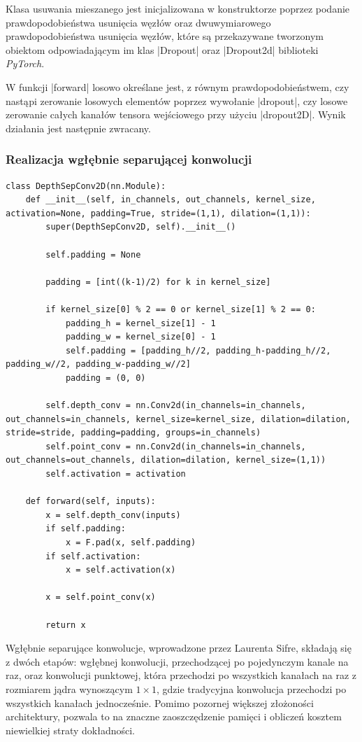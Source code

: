 Klasa usuwania mieszanego jest inicjalizowana w konstruktorze poprzez podanie prawdopodobieństwa usunięcia węzłów oraz dwuwymiarowego prawdopodobieństwa usunięcia węzłów, które są przekazywane tworzonym obiektom odpowiadającym im klas \pyth|Dropout| oraz \pyth|Dropout2d| biblioteki \textit{PyTorch}.

W funkcji \pyth|forward| losowo określane jest, z równym prawdopodobieństwem, czy nastąpi zerowanie losowych elementów poprzez wywołanie \pyth|dropout|, czy losowe zerowanie całych kanałów tensora wejściowego przy użyciu \pyth|dropout2D|. Wynik działania jest następnie zwracany. 


\subsubsection{Realizacja wgłębnie separującej konwolucji}

\begin{lstlisting}[caption={\pyth|DepSepConv2D| - klasa wgłębnie separującej konwolucji dwuwymiarowej}, label={DepSepConv}]
class DepthSepConv2D(nn.Module):
	def __init__(self, in_channels, out_channels, kernel_size, activation=None, padding=True, stride=(1,1), dilation=(1,1)):
		super(DepthSepConv2D, self).__init__()
	
		self.padding = None
		
		padding = [int((k-1)/2) for k in kernel_size]
		
		if kernel_size[0] % 2 == 0 or kernel_size[1] % 2 == 0:
			padding_h = kernel_size[1] - 1
			padding_w = kernel_size[0] - 1
			self.padding = [padding_h//2, padding_h-padding_h//2, padding_w//2, padding_w-padding_w//2]
			padding = (0, 0)
		
		self.depth_conv = nn.Conv2d(in_channels=in_channels, out_channels=in_channels, kernel_size=kernel_size, dilation=dilation, stride=stride, padding=padding, groups=in_channels)
		self.point_conv = nn.Conv2d(in_channels=in_channels, out_channels=out_channels, dilation=dilation, kernel_size=(1,1))
		self.activation = activation
	
	def forward(self, inputs):
		x = self.depth_conv(inputs)
		if self.padding:
			x = F.pad(x, self.padding)
		if self.activation:
			x = self.activation(x)
		
		x = self.point_conv(x)
		
		return x
\end{lstlisting}


Wgłębnie separujące konwolucje, wprowadzone przez Laurenta Sifre\cite{Sifre2014}, składają się z dwóch etapów: wgłębnej konwolucji, przechodzącej po pojedynczym kanale na raz, oraz konwolucji punktowej, która przechodzi po wszystkich kanałach na raz z rozmiarem jądra wynoszącym $1 \times 1$, gdzie tradycyjna konwolucja przechodzi po wszystkich kanałach jednocześnie. Pomimo pozornej większej złożoności architektury, pozwala to na znaczne zaoszczędzenie pamięci i obliczeń kosztem niewielkiej straty dokładności.


